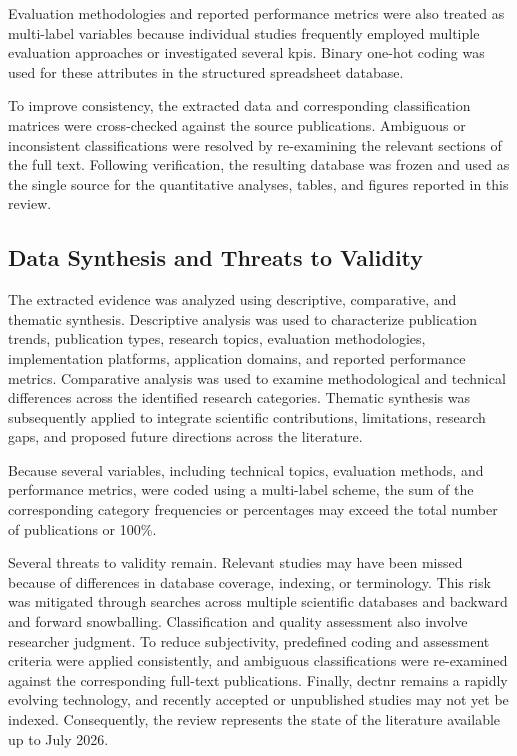 Evaluation methodologies and reported performance metrics were also treated as multi-label variables because individual studies frequently employed multiple evaluation approaches or investigated several \glspl{kpi}. Binary one-hot coding was used for these attributes in the structured spreadsheet database.

To improve consistency, the extracted data and corresponding classification matrices were cross-checked against the source publications. Ambiguous or inconsistent classifications were resolved by re-examining the relevant sections of the full text. Following verification, the resulting database was frozen and used as the single source for the quantitative analyses, tables, and figures reported in this review.

\subsection{Data Synthesis and Threats to Validity}
\label{subsec:data_synthesis}

The extracted evidence was analyzed using descriptive, comparative, and thematic synthesis. Descriptive analysis was used to characterize publication trends, publication types, research topics, evaluation methodologies, implementation platforms, application domains, and reported performance metrics. Comparative analysis was used to examine methodological and technical differences across the identified research categories. Thematic synthesis was subsequently applied to integrate scientific contributions, limitations, research gaps, and proposed future directions across the literature.

Because several variables, including technical topics, evaluation methods, and performance metrics, were coded using a multi-label scheme, the sum of the corresponding category frequencies or percentages may exceed the total number of publications or 100\%.

Several threats to validity remain. Relevant studies may have been missed because of differences in database coverage, indexing, or terminology. This risk was mitigated through searches across multiple scientific databases and backward and forward snowballing. Classification and quality assessment also involve researcher judgment. To reduce subjectivity, predefined coding and assessment criteria were applied consistently, and ambiguous classifications were re-examined against the corresponding full-text publications. Finally, \gls{dectnr} remains a rapidly evolving technology, and recently accepted or unpublished studies may not yet be indexed. Consequently, the review represents the state of the literature available up to July 2026.